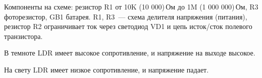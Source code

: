 Компоненты на схеме: резистор R1 от 10K (10 000)\,Ом до 1M (1 000 000)\,Ом,
R3 фоторезистор, GB1 батарея. R1, R3\ --- схема делителя напряжения (питания),
резистор R2 ограничивает ток через светодиод VD1 и цепь исток/сток полевого
транзистора.

В темноте LDR имеет высокое сопротивление, и напряжение на выходе высокое.

На свету LDR имеет низкое сопротивление, и напряжение падает.

